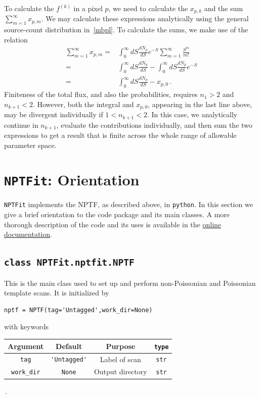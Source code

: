 To calculate the $f^{(k)}$ in a pixel $p$, we need to calculate the $x_{p,k}$ and the sum $\sum_{m=1}^\infty x_{p,m}$.  We may calculate these expressions analytically using the general source-count distribution in~\eqref{mbpl}.  To calculate the sums, we make use of the relation 
\begin{equation}\begin{aligned}
\sum_{m=1}^{\infty} x_{p,m} = &\int_0^{\infty} dS \frac{dN_p}{dS} e^{-S} \sum_{m=1}^{\infty} \frac{S^m}{m!} \\
= &\int_0^{\infty} dS \frac{dN_p}{dS} - \int_0^{\infty} dS \frac{dN_p}{dS} e^{-S} \\
= &\int_0^{\infty} dS \frac{dN_p}{dS} - x_{p,0}\,.
\end{aligned}
\label{eq:xmsum}
\end{equation}
Finiteness of the total flux, and also the probabilities, requires $n_1 > 2$ and $n_{k+1} < 2$.  However,  
both the integral and $x_{p,0}$, appearing in the last line above, may be divergent individually if $1 < n_{k+1} < 2$.  In this case, we analytically continue in $n_{k+1}$, evaluate the contributions individually, and then sum the two expressions to get a result that is finite across the whole range of allowable parameter space. %

\section{\texttt{NPTFit}: Orientation}
\label{NPTFit-orientation}

\texttt{NPTFit} implements the NPTF, as described above, in \texttt{python}.  In this section we give a brief orientation to the code package and its main classes.  A more thorough description of the code and its uses is available in the \href{http://nptfit.readthedocs.io}{online documentation}.

\subsection*{ \lstinline{class NPTFit.nptfit.NPTF} }

This is the main class used to set up and perform non-Poissonian and Poissonian template scans.  It is initialized by   
\begin{lstlisting}
nptf = NPTF(tag='Untagged',work_dir=None)
\end{lstlisting}
with keywords 
\begin{center}
\begin{tabular}{ cccc}
\toprule
Argument &  Default & Purpose & \lstinline!type! \\ 
\midrule
\lstinline!tag! & \lstinline!'Untagged'! & Label of scan & \lstinline!str! \\  
\lstinline!work_dir! & \lstinline!None! & Output directory & \lstinline!str!  \\  
\bottomrule
\end{tabular} \,.
\end{center}


